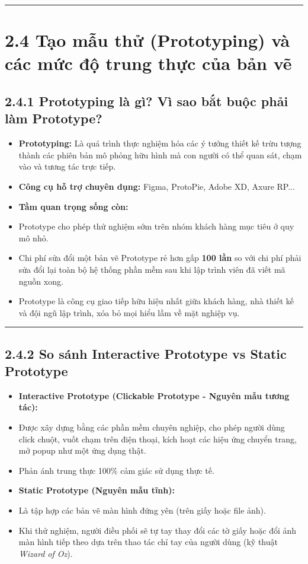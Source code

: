 \documentclass[11pt,a4paper,oneside]{report}
\begin{document}
\bigskip\hrule\bigskip

\section{2.4 Tạo mẫu thử (Prototyping) và các mức độ trung thực của bản vẽ}

\subsection{2.4.1 Prototyping là gì? Vì sao bắt buộc phải làm Prototype?}
\begin{itemize}[leftmargin=1.5em]
\item \textbf{Prototyping:} Là quá trình thực nghiệm hóa các ý tưởng thiết kế trừu tượng thành các phiên bản mô phỏng hữu hình mà con người có thể quan sát, chạm vào và tương tác trực tiếp.
\item \textbf{Công cụ hỗ trợ chuyên dụng:} Figma, ProtoPie, Adobe XD, Axure RP...
\item \textbf{Tầm quan trọng sống còn:}
\item Prototype cho phép thử nghiệm sớm trên nhóm khách hàng mục tiêu ở quy mô nhỏ.
\item Chi phí sửa đổi một bản vẽ Prototype rẻ hơn gấp \textbf{100 lần} so với chi phí phải sửa đổi lại toàn bộ hệ thống phần mềm sau khi lập trình viên đã viết mã nguồn xong.
\item Prototype là công cụ giao tiếp hữu hiệu nhất giữa khách hàng, nhà thiết kế và đội ngũ lập trình, xóa bỏ mọi hiểu lầm về mặt nghiệp vụ.
\end{itemize}

\bigskip\hrule\bigskip

\subsection{2.4.2 So sánh Interactive Prototype vs Static Prototype}
\begin{itemize}[leftmargin=1.5em]
\item \textbf{Interactive Prototype (Clickable Prototype - Nguyên mẫu tương tác):}
\item Được xây dựng bằng các phần mềm chuyên nghiệp, cho phép người dùng click chuột, vuốt chạm trên điện thoại, kích hoạt các hiệu ứng chuyển trang, mở popup như một ứng dụng thật.
\item Phản ánh trung thực 100\% cảm giác sử dụng thực tế.
\item \textbf{Static Prototype (Nguyên mẫu tĩnh):}
\item Là tập hợp các bản vẽ màn hình đứng yên (trên giấy hoặc file ảnh).
\item Khi thử nghiệm, người điều phối sẽ tự tay thay đổi các tờ giấy hoặc đổi ảnh màn hình tiếp theo dựa trên thao tác chỉ tay của người dùng (kỹ thuật \textit{Wizard of Oz}).
\end{itemize}
\end{document}
